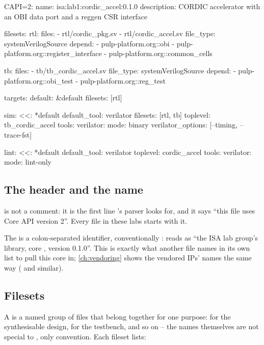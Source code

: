 \begin{corecode}[caption={cordic\_accel.core -- lab1/cordic\_accel.core (trimmed)},label={lst:fusesoc:core}]
CAPI=2:
name: isa:lab1:cordic_accel:0.1.0
description: CORDIC accelerator with an OBI data port and a reggen CSR interface

filesets:
  rtl:
    files:
      - rtl/cordic_pkg.sv
      - rtl/cordic_accel.sv
    file_type: systemVerilogSource
    depend:
      - pulp-platform.org::obi
      - pulp-platform.org::register_interface
      - pulp-platform.org::common_cells

  tb:
    files:
      - tb/tb_cordic_accel.sv
    file_type: systemVerilogSource
    depend:
      - pulp-platform.org::obi_test
      - pulp-platform.org::reg_test

targets:
  default: &default
    filesets: [rtl]

  sim:
    <<: *default
    default_tool: verilator
    filesets: [rtl, tb]
    toplevel: tb_cordic_accel
    tools:
      verilator:
        mode: binary
        verilator_options: [--timing, --trace-fst]

  lint:
    <<: *default
    default_tool: verilator
    toplevel: cordic_accel
    tools:
      verilator:
        mode: lint-only
\end{corecode}

\subsection{The header and the name}

 is not a comment: it is the first line \FuseSoC's parser
looks for, and it says ``this file uses Core API version 2''. Every
 file in these labs starts with it.

The  is a colon-separated identifier, conventionally
: 
reads as ``the ISA lab group's  library, core
, version 0.1.0''. This is exactly what another
 file names in its own  list to pull this core in;
\cref{ch:vendoring} shows the vendored IPs' names the same way
( and similar).

\subsection{Filesets}

A  is a named group of files that belong together for one
purpose:  for the synthesisable design,  for the
testbench, and so on -- the names themselves are not special to \FuseSoC,
only convention. Each fileset lists:

